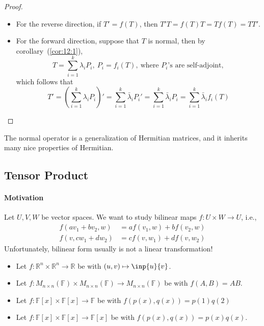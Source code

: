 \begin{proof}
\begin{itemize}
\item
For the reverse direction, if $T'=f(T)$, then $T'T=f(T)T=Tf(T)=TT'$.
\item
For the forward direction, suppose that $T$ is normal, then by corollary~(\ref{cor:12:1}),
\[
T=\sum_{i=1}^k\lambda_iP_i,\ P_i = f_i(T),\ \text{where $P_i$'s are self-adjoint},
\]
which follows that
\[
T'=\left(\sum_{i=1}^k\lambda_iP_i\right)'
=
\sum_{i=1}^k\bar{\lambda}_iP_i' = \sum_{i=1}^k\bar{\lambda}_iP_i
=
\sum_{i=1}^k\bar{\lambda}_if_i(T)
\]
\end{itemize}
\end{proof}
\begin{remark}
The normal operator is a generalization of Hermitian matrices, and it inherits many nice properties of Hermitian.
\end{remark}

\subsection{Tensor Product}
\paragraph{Motivation}
Let $U,V,W$ be vector spaces.
We want to study bilinear maps $f:U\times W\to U$, i.e.,
\begin{align*}
f(av_1+bv_2,w)&=af(v_1,w)+bf(v_2,w)\\
f(v,cw_1+dw_2)&=cf(v,w_1)+df(v,w_2)
\end{align*}
Unfortunately, bilinear form usually is not a linear transformation!

\begin{example}
\begin{itemize}
\item
Let $f:\mathbb{R}^n\times\mathbb{R}^n\to\mathbb{R}$ be with $(u,v)\mapsto\inp{u}{v}$.
\item
Let $f:M_{n\times n}(\mathbb{F})\times M_{n\times n}(\mathbb{F})\to M_{n\times n}(\mathbb{F})$ be with $f(A,B)=AB$.
\item
Let $f:\mathbb{F}[x]\times\mathbb{F}[x]\to\mathbb{F}$ be  with $f(p(x),q(x))=p(1)q(2)$
\item
Let $f:\mathbb{F}[x]\times\mathbb{F}[x]\to\mathbb{F}[x]$ be with $f(p(x),q(x))=p(x)q(x)$.
\end{itemize}
\end{example}











